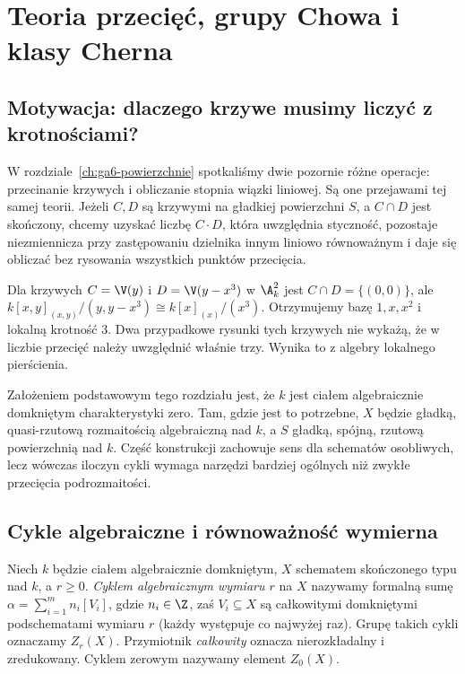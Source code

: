 \chapter{Teoria przecięć, grupy Chowa i klasy Cherna}
\label{ch:ga7-chow-chern}

\providecommand{\atlasref}[2]{#2}


\section{Motywacja: dlaczego krzywe musimy liczyć z krotnościami?}
\label{sec:ga7-motivation}

W rozdziale~\ref{ch:ga6-powierzchnie} spotkaliśmy dwie pozornie różne
operacje: przecinanie krzywych i obliczanie stopnia wiązki liniowej.
Są one przejawami tej samej teorii. Jeżeli $C,D$ są krzywymi na
gładkiej powierzchni $S$, a $C\cap D$ jest skończony, chcemy
uzyskać liczbę $C\cdot D$, która uwzględnia styczność,
pozostaje niezmiennicza przy zastępowaniu dzielnika innym
liniowo równoważnym i daje się obliczać bez rysowania
wszystkich punktów przecięcia.

\begin{przyklad}
Dla krzywych $C=\V(y)$ i $D=\V(y-x^3)$ w $\A^2_k$ jest
$C\cap D=\{(0,0)\}$, ale
$k[x,y]_{(x,y)}/(y,y-x^3)\cong k[x]_{(x)}/(x^3)$.
Otrzymujemy bazę $1,x,x^2$ i lokalną krotność $3$.
Dwa przypadkowe rysunki tych krzywych nie wykażą,
że w liczbie przecięć należy uwzględnić właśnie trzy.
Wynika to z algebry lokalnego pierścienia.
\end{przyklad}

Założeniem podstawowym tego rozdziału jest, że $k$ jest
ciałem algebraicznie domkniętym charakterystyki zero.
Tam, gdzie jest to potrzebne, $X$ będzie gładką,
quasi-rzutową rozmaitością algebraiczną nad $k$,
a $S$ gładką, spójną, rzutową powierzchnią nad $k$.
Część konstrukcji zachowuje sens dla schematów osobliwych,
lecz wówczas iloczyn cykli wymaga narzędzi bardziej ogólnych
niż zwykłe przecięcia podrozmaitości.

\section{Cykle algebraiczne i równoważność wymierna}
\label{sec:ga7-cycles}

\begin{definicja}
\label{def:ga7-cycles}
Niech $k$ będzie ciałem algebraicznie domkniętym,
$X$ schematem skończonego typu nad $k$, a $r\ge0$.
\emph{Cyklem algebraicznym wymiaru $r$} na $X$ nazywamy formalną
sumę $\alpha=\sum_{i=1}^m n_i[V_i]$, gdzie $n_i\in\Z$,
zaś $V_i\subseteq X$ są całkowitymi domkniętymi podschematami
wymiaru $r$ (każdy występuje co najwyżej raz).
Grupę takich cykli oznaczamy $Z_r(X)$.
Przymiotnik \emph{całkowity} oznacza nierozkładalny i zredukowany.
Cyklem zerowym nazywamy element $Z_0(X)$.
\end{definicja}

